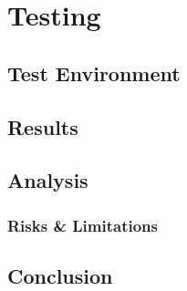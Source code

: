 %
\section{Testing}
%

%
\subsection{Test Environment}
%

%
\subsection{Results}
%

%
\subsection{Analysis}
%

%
\subsubsection{Risks \& Limitations}
%


%
\subsection{Conclusion}
%
